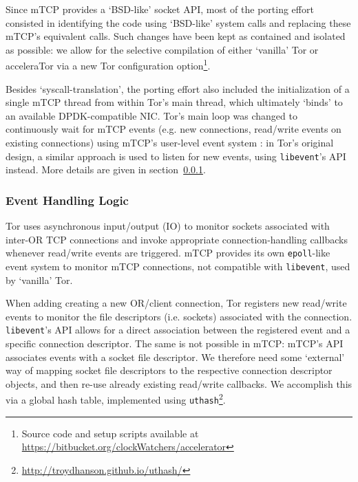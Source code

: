 \documentclass[conference]{IEEEtran}
\begin{document}
Since mTCP provides a `BSD-like' socket API, most of the porting effort 
consisted in identifying the code using `BSD-like' system calls and 
replacing these mTCP's equivalent calls. Such changes have been kept as 
contained and isolated as possible: we allow for the selective  
compilation of either `vanilla' Tor or acceleraTor via a new 
Tor configuration option\footnote{Source code and setup scripts available 
at \url{https://bitbucket.org/clockWatchers/accelerator}}.

Besides `syscall-translation', the porting effort also included the 
initialization of a single mTCP thread from within Tor's main thread, 
which ultimately `binds' to an available DPDK-compatible NIC. Tor's main loop 
was changed to continuously wait for mTCP events (e.g. new connections, 
read\slash write events on existing connections) using mTCP's user-level event 
system : in Tor's original design, a similar approach is used to listen for 
new events, using \verb+libevent+'s API instead. More details are given in 
section~\ref{subsubsec:design-mtcp-event}.


\subsubsection{Event Handling Logic}
\label{subsubsec:design-mtcp-event}

Tor uses asynchronous input\slash output (IO) to monitor sockets 
associated with inter-OR TCP connections and invoke appropriate connection-handling 
callbacks whenever read\slash write events are triggered. mTCP provides 
its own \verb+epoll+-like event system to monitor mTCP connections, not 
compatible with \verb+libevent+, used by `vanilla' Tor.

When adding creating a new OR\slash client connection, Tor registers new read\slash write 
events to monitor the file descriptors (i.e. sockets) associated with the 
connection. \verb+libevent+'s API allows 
for a direct association between the registered event and a 
specific connection descriptor. The same is not possible in mTCP: mTCP's API 
associates events with a socket file descriptor. We 
therefore need some `external' way of mapping socket file descriptors to the 
respective connection descriptor objects, and then re-use already existing 
read\slash write callbacks. We accomplish this via a global hash 
table, implemented 
using \verb+uthash+\footnote{\url{http://troydhanson.github.io/uthash/}}.
\end{document}
